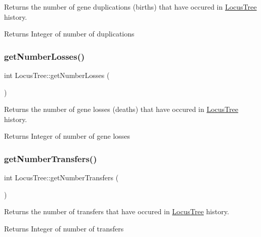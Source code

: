 Returns the number of gene duplications (births) that have occured in \mbox{\hyperlink{class_locus_tree}{Locus\+Tree}} history. 

\begin{DoxyReturn}{Returns}
Integer of number of duplications 
\end{DoxyReturn}
\mbox{\label{class_locus_tree_a4bbad232a6763f1c7a16162cd50ae12d}} 
\subsubsection{\texorpdfstring{getNumberLosses()}{getNumberLosses()}}
{\footnotesize\ttfamily int Locus\+Tree\+::get\+Number\+Losses (\begin{DoxyParamCaption}{ }\end{DoxyParamCaption})}



Returns the number of gene losses (deaths) that have occured in \mbox{\hyperlink{class_locus_tree}{Locus\+Tree}} history. 

\begin{DoxyReturn}{Returns}
Integer of number of gene losses 
\end{DoxyReturn}
\mbox{\label{class_locus_tree_a18be5f9a0732dd0e3eac0efac16bc258}} 
\subsubsection{\texorpdfstring{getNumberTransfers()}{getNumberTransfers()}}
{\footnotesize\ttfamily int Locus\+Tree\+::get\+Number\+Transfers (\begin{DoxyParamCaption}{ }\end{DoxyParamCaption})}



Returns the number of transfers that have occured in \mbox{\hyperlink{class_locus_tree}{Locus\+Tree}} history. 

\begin{DoxyReturn}{Returns}
Integer of number of transfers 
\end{DoxyReturn}
\mbox{\label{class_locus_tree_aadc6be0b7998a9af9c815693b17bbd75}} 
